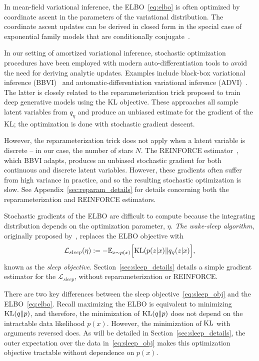In mean-field variational inference, the ELBO~\eqref{eq:elbo} is often optimized by coordinate ascent in the parameters of the variational distribution. 
The coordinate ascent updates can be derived in closed form in the special case of exponential family models that are conditionally conjugate~\cite{Blei_2017_vi_review}. 

In our setting of amortized variational inference, stochastic 
optimization procedures have been employed with modern 
auto-differentiation tools to avoid the need for deriving 
analytic updates. Examples include black-box variational inference (BBVI)~\cite{ranganath2013black} 
and automatic-differentiation variational inference (ADVI)~\cite{kucukelbir2016automatic}. The latter 
is closely related to the reparameterization trick \cite{kingma2013autoencoding, rezende2014stochastic} proposed to train deep generative models using the KL objective. 
These approaches all sample latent variables from $q_\eta$ and produce an unbiased estimate 
for the gradient of the KL; the optimization is done with stochastic gradient descent. 

However, the reparameterization trick does not apply when a latent variable is discrete -- in our case, the number of stars $N$. The REINFORCE estimator~\cite{Williams1992reinforce}, which BBVI adapts, produces an unbiased stochastic gradient for both continuous and discrete latent variables. However, these gradients often suffer from high variance in practice, and so the resulting stochastic optimization is slow. See Appendix~\ref{sec:reparam_details} for details concerning both the reparameterization and REINFORCE estimators. 

Stochastic gradients of the ELBO are difficult to compute because the integrating distribution depends on the optimization parameter, $\eta$. 
{\itshape The wake-sleep algorithm}, originally proposed by~\cite{Hinton1995wake_sleep}, replaces the 
ELBO objective with 
\begin{align}
    \mathcal{L}_{sleep}(\eta) := 
    - \mathbb{E}_{x \sim p(x)}\Big[\textrm{KL}(p(z | x) \| q_\eta(z | x)\Big]
    \label{eq:sleep_obj},
\end{align}
known as the {\itshape sleep objective}. 
Section~\ref{sec:sleep_details} details a simple gradient estimator for the $\mathcal{L}_{sleep}$, without reparameterization or REINFORCE. 

There are two key differences between the sleep objective~\eqref{eq:sleep_obj} and the ELBO~\eqref{eq:elbo}. 
Recall maximizing the ELBO is equivalent to minimizing
$\textrm{KL}(q\|p)$, and 
therefore, the minimization of $\textrm{KL}(q\|p)$ does not depend on the intractable data likelihood $p(x)$. 
However, the minimization of $\textrm{KL}$ with arguments reversed does. 
As will be detailed in Section~\ref{sec:sleep_details}, the outer expectation over the data in~\eqref{eq:sleep_obj} makes this optimization objective tractable without dependence on $p(x)$. 

